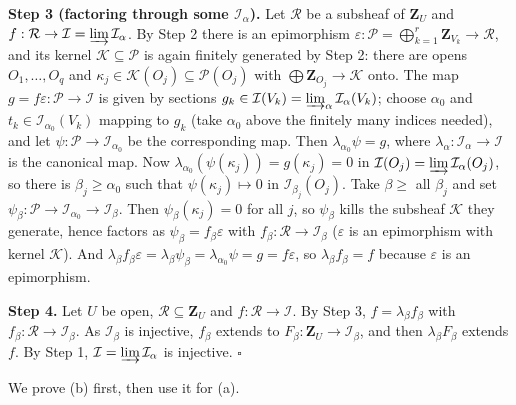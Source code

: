 \documentclass[11pt]{article}
\begin{document}
\textbf{Step 3 (factoring through some $\mathcal I_\alpha$).} Let $\mathcal R$ be a subsheaf of $\mathbf Z_U$ and $f:\mathcal R\to\mathcal I=\varinjlim\mathcal I_\alpha$. By Step 2 there is an epimorphism $\varepsilon:\mathcal P=\bigoplus_{k=1}^r\mathbf Z_{V_k}\to\mathcal R$, and its kernel $\mathcal K\subseteq\mathcal P$ is again finitely generated by Step 2: there are opens $O_1,\dots,O_q$ and $\kappa_j\in\mathcal K(O_j)\subseteq\mathcal P(O_j)$ with $\bigoplus\mathbf Z_{O_j}\to\mathcal K$ onto. The map $g=f\varepsilon:\mathcal P\to\mathcal I$ is given by sections $g_k\in\mathcal I(V_k)=\varinjlim_\alpha\mathcal I_\alpha(V_k)$; choose $\alpha_0$ and $t_k\in\mathcal I_{\alpha_0}(V_k)$ mapping to $g_k$ (take $\alpha_0$ above the finitely many indices needed), and let $\psi:\mathcal P\to\mathcal I_{\alpha_0}$ be the corresponding map. Then $\lambda_{\alpha_0}\psi=g$, where $\lambda_\alpha:\mathcal I_\alpha\to\mathcal I$ is the canonical map. Now $\lambda_{\alpha_0}(\psi(\kappa_j))=g(\kappa_j)=0$ in $\mathcal I(O_j)=\varinjlim\mathcal I_\alpha(O_j)$, so there is $\beta_j\ge\alpha_0$ such that $\psi(\kappa_j)\mapsto0$ in $\mathcal I_{\beta_j}(O_j)$. Take $\beta\ge$ all $\beta_j$ and set $\psi_\beta:\mathcal P\to\mathcal I_{\alpha_0}\to\mathcal I_\beta$. Then $\psi_\beta(\kappa_j)=0$ for all $j$, so $\psi_\beta$ kills the subsheaf $\mathcal K$ they generate, hence factors as $\psi_\beta=f_\beta\varepsilon$ with $f_\beta:\mathcal R\to\mathcal I_\beta$ ($\varepsilon$ is an epimorphism with kernel $\mathcal K$). And $\lambda_\beta f_\beta\varepsilon=\lambda_\beta\psi_\beta=\lambda_{\alpha_0}\psi=g=f\varepsilon$, so $\lambda_\beta f_\beta=f$ because $\varepsilon$ is an epimorphism.

\textbf{Step 4.} Let $U$ be open, $\mathcal R\subseteq\mathbf Z_U$ and $f:\mathcal R\to\mathcal I$. By Step 3, $f=\lambda_\beta f_\beta$ with $f_\beta:\mathcal R\to\mathcal I_\beta$. As $\mathcal I_\beta$ is injective, $f_\beta$ extends to $F_\beta:\mathbf Z_U\to\mathcal I_\beta$, and then $\lambda_\beta F_\beta$ extends $f$. By Step 1, $\mathcal I=\varinjlim\mathcal I_\alpha$ is injective. \hfill$\square$

\pf
We prove (b) first, then use it for (a).
\end{document}

